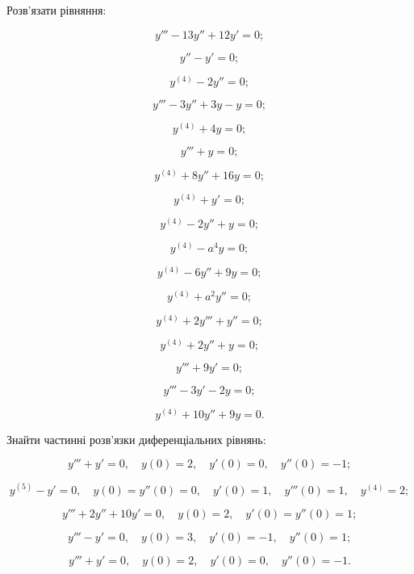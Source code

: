 Розв’язати рівняння:
\begin{multicols}{2}
\begin{problem}
	\[y'''-13y''+12y'=0;\]
\end{problem}
\begin{problem}
	\[y''-y'=0;\]
\end{problem}
\begin{problem}
	\[y^{(4)}-2y''=0;\]
\end{problem}
\begin{problem}
	\[y'''-3y''+3y-y=0;\]
\end{problem}
\begin{problem}
	\[y^{(4)}+4y=0;\]
\end{problem}
\begin{problem}
	\[y'''+y=0;\]
\end{problem}
\begin{problem}
	\[y^{(4)}+8y''+16y=0;\]
\end{problem}
\begin{problem}
	\[y^{(4)}+y'=0;\]
\end{problem}
\begin{problem}
	\[y^{(4)}-2y''+y=0;\]
\end{problem}
\begin{problem}
	\[y^{(4)}-a^4y=0;\]
\end{problem}
\begin{problem}
	\[y^{(4)}-6y''+9y=0;\]
\end{problem}
\begin{problem}
	\[y^{(4)}+a^2y''=0;\]
\end{problem}
\begin{problem}
	\[y^{(4)}+2y'''+y''=0;\]
\end{problem}
\begin{problem}
	\[y^{(4)}+2y''+y=0;\]
\end{problem}
\begin{problem}
	\[y'''+9y'=0;\]
\end{problem}
\begin{problem}
	\[y'''-3y'-2y=0;\]
\end{problem}
\begin{problem}
	\[y^{(4)}+10y''+9y=0.\]
\end{problem}
\end{multicols}
Знайти частинні розв’язки диференціальних рівнянь:
\begin{problem}
	\[y'''+y'=0, \quad y(0)=2, \quad y'(0)=0, \quad y''(0)=-1;\]
\end{problem}
\begin{problem}
	\[y^{(5)}-y'=0, \quad y(0)=y''(0)=0, \quad y'(0)=1, \quad y'''(0)=1, \quad y^{(4)}=2;\]
\end{problem}
\begin{problem}
	\[y'''+2y''+10y'=0, \quad y(0)=2, \quad y'(0)=y''(0)=1;\]
\end{problem}
\begin{problem}
	\[y'''-y'=0, \quad y(0)=3, \quad y'(0)=-1, \quad y''(0)=1;\]
\end{problem}
\begin{problem}
	\[y'''+y'=0, \quad y(0)=2, \quad y'(0)=0, \quad y''(0)=-1.\]
\end{problem}